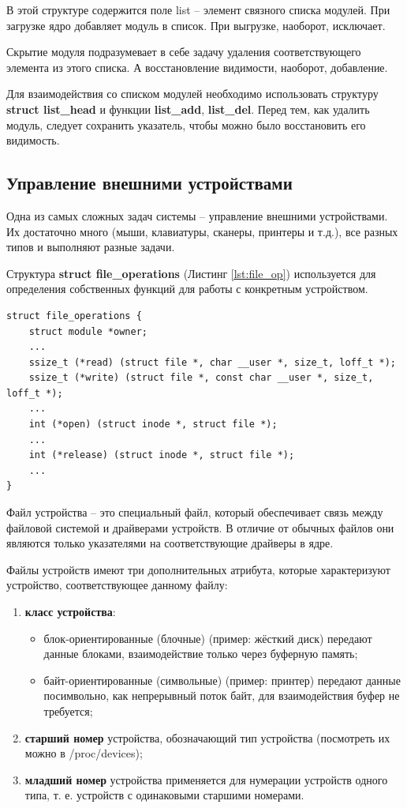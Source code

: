 В этой структуре содержится поле list -- элемент связного списка модулей. При загрузке ядро добавляет модуль в список. При выгрузке, наоборот, исключает. 

Скрытие модуля подразумевает в себе задачу удаления соответствующего элемента из этого списка. А восстановление видимости, наоборот, добавление.

Для взаимодействия со списком модулей необходимо использовать структуру \textbf{struct list\_head} и функции \textbf{list\_add}, \textbf{list\_del}. Перед тем, как удалить модуль, следует сохранить указатель, чтобы можно было восстановить его видимость. \cite{hide} \newline

\subsection{Управление внешними устройствами}
Одна из самых сложных задач системы -- управление внешними устройствами. Их достаточно много (мыши, клавиатуры, сканеры, принтеры и т.д.), все разных типов и выполняют разные задачи.  

Структура \textbf{struct file\_operations} (Листинг \ref{lst:file_op}) используется для определения собственных функций для работы с конкретным устройством. 
\begin{lstlisting}[caption = {struct file\_operations}, label=lst:file_op]
struct file_operations {
	struct module *owner;
	...
	ssize_t (*read) (struct file *, char __user *, size_t, loff_t *);
	ssize_t (*write) (struct file *, const char __user *, size_t, loff_t *);
	...
	int (*open) (struct inode *, struct file *);
	...
	int (*release) (struct inode *, struct file *);
	...
}
\end{lstlisting}

Файл устройства -- это специальный файл, который обеспечивает связь между файловой системой и драйверами устройств. В отличие от обычных файлов они являются только указателями на соответствующие драйверы в ядре.

Файлы устройств имеют три дополнительных атрибута, которые характеризуют устройство, соответствующее данному файлу:
\begin{enumerate}
	\item \textbf{класс устройства}:
	\begin{itemize}
		\item блок-ориентированные (блочные) (пример: жёсткий диск) передают данные блоками, взаимодействие только через буферную память;
		\item байт-ориентированные (символьные) (пример: принтер) передают данные посимвольно, как непрерывный поток байт, для взаимодействия буфер не требуется;
	\end{itemize}

	\item \textbf{старший номер} устройства, обозначающий тип устройства (посмотреть их можно в /proc/devices);
	
	\item \textbf{младший номер} устройства применяется для нумерации устройств одного типа, т. е. устройств с одинаковыми старшими номерами.
\end{enumerate}

